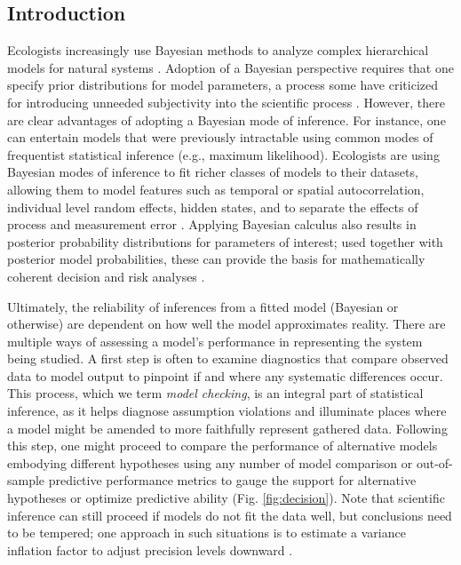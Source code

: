 \documentclass[12pt,english]{article}
\begin{document}
\begin{spacing}{1.9}
\def\VAR{{\rm Var}\,}
\def\COV{{\rm Cov}\,}
\def\Prob{{\rm P}\,}
\def\bfX{{\bf X}\,}
\def\bfY{{\bf Y}\,}
\def\bfy{{\bf y}}
\def\bfZ{{\bf Z}\,}
\def\bftheta{\boldsymbol{\theta}}
\def\bfeta{\boldsymbol{\eta}}


\section{Introduction}

Ecologists increasingly use Bayesian methods to analyze complex hierarchical models for natural systems \citep{HobbsHooten2015}.  Adoption of a Bayesian perspective requires that one specify prior distributions for model parameters, a process some have criticized for introducing unneeded subjectivity into the scientific process \citep{LeleDennis2009}.  However, there are clear advantages of adopting a Bayesian mode of inference.  For instance, one can entertain models that were previously intractable using common modes of frequentist statistical inference (e.g., maximum likelihood). Ecologists are using Bayesian modes of inference to fit richer classes of models to their datasets, allowing them to model features such as temporal or spatial autocorrelation, individual level random effects, hidden states, and to separate the effects of process and measurement error \citep{LinkEtAl2002,ClarkBjornstad2004,CressieEtAl2009}. Applying Bayesian calculus also results in posterior probability distributions for parameters of interest; used together with posterior model probabilities, these can provide the basis for mathematically coherent decision and risk analyses \citep{LinkBarker2006,Berger2013}.

Ultimately, the reliability of inferences from a fitted model (Bayesian or otherwise) are dependent on how well the model approximates reality.  There are multiple ways of assessing a model's performance in representing the system being studied. A first step is often to examine diagnostics that compare observed data to model output to pinpoint if and where any systematic differences occur. This process, which we term \textit{model checking}, is an integral part of statistical inference, as it helps diagnose assumption violations and illuminate places where a model might be amended to more faithfully represent gathered data. Following this step, one might proceed to compare the performance of alternative models embodying different hypotheses using any number of model comparison or out-of-sample predictive performance metrics \citep[see][for a review]{HootenHobbs2015} to gauge the support for alternative hypotheses or optimize predictive ability (Fig. \ref{fig:decision}).  Note that scientific inference can still proceed if models do not fit the data well, but conclusions need to be tempered; one approach in such situations is to estimate a variance inflation factor to adjust precision levels downward \citep[e.g.][]{CoxSnell1989,McCullaghNelder1989}.


\end{spacing}
\end{document}
